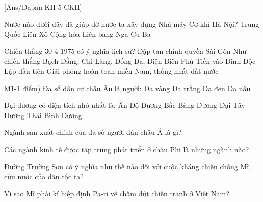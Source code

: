 \newpage
\setcounter{ex}{0}
[Ans/Dapan-KH-5-CKII]
\hienthiloigiaiex
{}
\begin{ex}[M1-1 điểm]
	Nước nào dưới đây đã giúp đỡ nước ta xây dựng Nhà máy Cơ khí Hà Nội?
	\choice
	{Trung Quốc}
	{\True Liên Xô}
	{Cộng hòa Liên bang Nga}
	{Cu Ba}
	\loigiai{}
\end{ex}
\begin{ex}[M2-1 điểm]
	Chiến thắng 30-4-1975 có ý nghĩa lịch sử?
	\choice
	{Đập tan chính quyền Sài Gòn}
	{Như chiến thắng Bạch Đằng, Chi Lăng, Đống Đa, Điện Biên Phủ}
	{Tiến vào Dinh Độc Lập đầu tiên}
	{\True Giải phóng hoàn toàn miền Nam, thống nhất đất nước}
	\loigiai{}
\end{ex}
\begin{ex}
	M1-1 điểm) Đa số dân cư châu Âu là người:
	\choice
	{Da vàng}
	{\True Da trắng}
	{Da đen}
	{Da nâu}
	\loigiai{}
\end{ex}
\begin{ex}[M2-1 điểm]
	Đại dương có diện tích nhỏ nhất là:
	\choice
	{Ấn Độ Dương}
	{\True Bắc Băng Dương}
	{Đại Tây Dương}
	{Thái Bình Dương}
	\loigiai{}
\end{ex}
\hienthiloigiaiex
\begin{ex}
	Ngành sản xuất chính của đa số người dân châu Á là gì? 
\end{ex}
\begin{ex}
Các ngành kinh tế được tập trung phát triển ở châu Phi là những ngành nào?

\end{ex}
\begin{ex}
Đường Trường Sơn có ý nghĩa như thế nào dối với cuộc kháng chiến chống Mĩ, cứu nước của dân tộc ta?
\end{ex}
\begin{ex}
Vì sao Mĩ phải kí hiệp định Pa-ri về chấm dứt chiến tranh ở Việt Nam? 
\end{ex}
